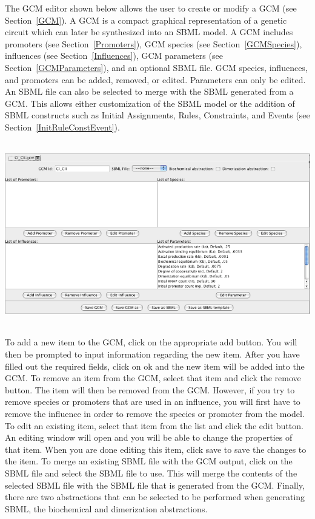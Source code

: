 \documentclass[titlepage,11pt]{article}
\begin{document}
\noindent
The GCM editor shown below allows the user to create or modify a GCM 
(see Section~\ref{GCM}).  A GCM is a compact graphical representation 
of a genetic circuit which can later be synthesized into an SBML model. 
A GCM includes promoters (see Section~\ref{Promoters}),
GCM species (see Section~\ref{GCMSpecies}), 
influences (see Section~\ref{Influences}), 
GCM parameters (see Section~\ref{GCMParameters}), and an optional
SBML file.  GCM species, influences, 
and promoters can be added, removed, or edited. Parameters can only be edited. 
An SBML file can also be selected to merge with the SBML generated from a GCM.
This allows either customization of the SBML model or the addition of SBML
constructs such as Initial Assignments, Rules, Constraints, 
and Events (see Section~\ref{InitRuleConstEvent}).
\begin{center}
\includegraphics[height=80mm]{screenshots/GCMedit}
\end{center}

To add a new item to the GCM, click on the appropriate add button. You
will then be prompted to input information regarding the new
item. After you have filled out the required fields, click on ok
and the new item will be added into the GCM.
To remove an item from the GCM, select that item and click the
remove button. The item will then be removed from the GCM.
However, if you try to remove species or promoters that are used in
an influence, you will first have to remove the influence in
order to remove the species or promoter from the model.
To edit an existing item, select that item from the list and
click the edit button. An editing window will open and you will
be able to change the properties of that item. When you are done
editing this item, click save to save the changes to the item. 
To merge an existing SBML file with the GCM output, click on
the SBML file and select the SBML file to use. This will merge
the contents of the selected SBML file with the SBML file that is 
generated from the GCM.  Finally, there are two abstractions that can
be selected to be performed when generating SBML, the biochemical and
dimerization abstractions.
\end{document}
